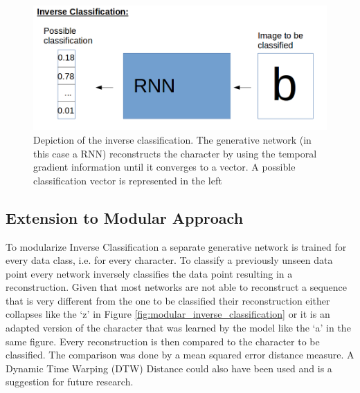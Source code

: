 \documentclass{article}
\begin{document}
\begin{figure}[!htb]
	\centering
	\includegraphics[width=\textwidth]{images/inverse_classification.png}
	\caption{Depiction of the inverse classification. The generative network (in this case a RNN) reconstructs the character by using the temporal gradient information until it converges to a vector. A possible classification vector is represented in the left}
	\label{fig:inverse_classification}
\end{figure}

\subsection{Extension to Modular Approach}
\label{subsec:extension_to_MC}

To modularize Inverse Classification a separate generative network is trained for every data class, i.e. for every character. To classify a previously unseen data point every network inversely classifies the data point resulting in a reconstruction. Given that most networks are not able to reconstruct a sequence that is very different from the one to be classified their reconstruction either collapses like the `z' in Figure \ref{fig:modular_inverse_classification} or it is an adapted version of the character that was learned by the model like the `a' in the same figure. Every reconstruction is then compared to the character to be classified. The comparison was done by a mean squared error distance measure. A Dynamic Time Warping (DTW) Distance could also have been used and is a suggestion for future research. 
\end{document}
